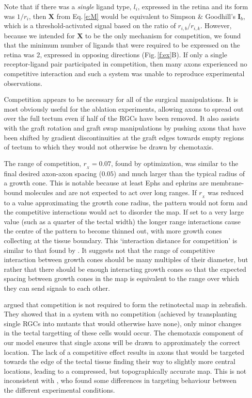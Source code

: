 \documentclass[11pt, a4paper]{article}
\begin{document}
Note that if there was a \emph{single} ligand type, $l_i$, expressed in the retina and its form was $1/r_i$, then $\mathbf{X}$ from Eq.\,\ref{e:M} would be equivalent to Simpson \& Goodhill's $\mathbf{I}_b$, which is a threshold-activated signal based on the ratio of $r_{i,b}/r_{i,k}$. 
However, because we intended for $\mathbf{X}$ to be the only mechanism for competition, we found that the minimum number of ligands that were required to be expressed on the retina was 2, expressed in opposing directions (Fig.\,\ref{f:ex}B). If only a single receptor-ligand pair participated in competition, then many axons experienced no competitive interaction and such a system was unable to reproduce experimental observations.

Competition appears to be necessary for all of the surgical manipulations. 
It is most obviously useful for the ablation experiments, allowing axons to spread out over the full tectum even if half of the RGCs have been removed.
It also assists with the graft rotation and graft swap manipulations by pushing axons that have been shifted by gradient discontinuities at the graft edges towards empty regions of tectum to which they would not otherwise be drawn by chemotaxis.

The range of competition, $r_{\!_X}=0.07$, found by optimization, was similar to the final desired axon-axon spacing ($0.05$) and much larger than the typical radius of a growth cone. This is notable because at least Ephs and ephrins are membrane-bound molecules \citep{cang_developmental_2013} and are not expected to act over long ranges.
If $r_{\!_X}$ was reduced to a value approximating the growth cone radius, the pattern would not form and the competitive interactions would act to disorder the map. 
If set to a very large value (such as a quarter of the tectal width) the longer range interactions cause the centre of the pattern to become thinned out, with more growth cones collecting at the tissue boundary.
This `interaction distance for competition' is similar to that found by \citet{simpson_simple_2011}. 
It suggests not that the range of competitive interaction between growth cones should be many multiples of their diameter, but rather that there should be enough interacting growth cones so that the expected spacing between growth cones in the map is equivalent to the range over which they can send signals to each other.

\citet{gosse_retinotopic_2008} argued that competition is not required to form the retinotectal map in zebrafish. They showed that in a system with no competition (achieved by transplanting single RGCs into mutants that would otherwise have none), only minor changes in the tectal targetting of these cells would occur.
The chemotaxis component of our model ensures that single axons will be drawn to approximately the correct location.
The lack of a competitive effect results in axons that would be targeted towards the edge of the tectal tissue finding their way to slightly more central locations, leading to a compressed, but topographically accurate map.
This is not inconsistent with \citet{gosse_retinotopic_2008}, who found some differences in targeting behaviour between the different experimental conditions.
\end{document}

